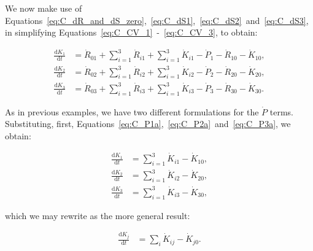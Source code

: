 %

We now make use of 
Equations~\ref{eq:C_dR_and_dS_zero},~\ref{eq:C_dS1},~\ref{eq:C_dS2}~and~\ref{eq:C_dS3},
in simplifying Equations~\ref{eq:C_CV_1}~-~\ref{eq:C_CV_3},
to obtain:

\begin{align} \label{eq:C_CV_1a}
	\frac{\mathrm{d}K_{1}}{\mathrm{d}t}		
	& =  \dot{R}_{01} 
	+ \sum_{i = 1}^{3}\dot{R}_{i1}
	+ \sum_{i = 1}^{3}\dot{K}_{i1}
	- \dot{P}_{1}
	- \dot{R}_{10} 
	- \dot{K}_{10},										\\
	\label{eq:C_CV_2a}
	\frac{\mathrm{d}K_{2}}{\mathrm{d}t}		
	& =  \dot{R}_{02} 
	+ \sum_{i = 1}^{3}\dot{R}_{i2}
	+ \sum_{i = 1}^{3}\dot{K}_{i2}
	- \dot{P}_{2}
	- \dot{R}_{20} 
	- \dot{K}_{20},										\\	
	\label{eq:C_CV_3a}
	\frac{\mathrm{d}K_{3}}{\mathrm{d}t}		
	& =  \dot{R}_{03} 
	+ \sum_{i = 1}^{3}\dot{R}_{i3}
	+ \sum_{i = 1}^{3}\dot{K}_{i3}
	- \dot{P}_{3}
	- \dot{R}_{30} 
	- \dot{K}_{30}.										
\end{align}

As in previous examples,
we have two different formulations for
the $\dot{P}$ terms.
Substituting, 
first, 
Equations~\ref{eq:C_P1a},~\ref{eq:C_P2a}~and~\ref{eq:C_P3a},
we obtain:

\begin{align} \label{eq:C_CV_1b}
	\frac{\mathrm{d}K_{1}}{\mathrm{d}t}		
	& = \sum_{i = 1}^{3}\dot{K}_{i1}
	- \dot{K}_{10},										\\
	\label{eq:C_CV_2b}
	\frac{\mathrm{d}K_{2}}{\mathrm{d}t}		
	& = \sum_{i = 1}^{3}\dot{K}_{i2}
	- \dot{K}_{20},										\\	
	\label{eq:C_CV_3b}
	\frac{\mathrm{d}K_{3}}{\mathrm{d}t}		
	& = \sum_{i = 1}^{3}\dot{K}_{i3}
	- \dot{K}_{30},										
\end{align}

\noindent{}which we may rewrite as the 
more general result:

\begin{align} \label{eq:C_CV_K_balance}
	\frac{\mathrm{d}K_{j}}{\mathrm{d}t}		
	& =  \sum_{i}\dot{K}_{ij}
	- \dot{K}_{j0}.
\end{align}

